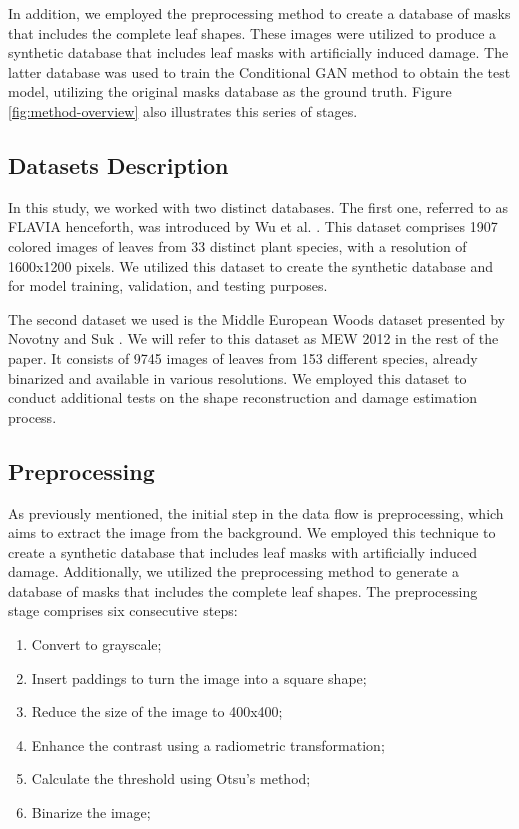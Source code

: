 In addition, we employed the preprocessing method to create a database of masks that includes the complete leaf shapes. These images were utilized to produce a synthetic database that includes leaf masks with artificially induced damage. The latter database was used to train the Conditional GAN method to obtain the test model, utilizing the original masks database as the ground truth. Figure \ref{fig:method-overview} also illustrates this series of stages.

\subsection{Datasets Description}

In this study, we worked with two distinct databases. The first one, referred to as FLAVIA henceforth, was introduced by Wu et al. \cite{wu2007leaf}. This dataset comprises 1907 colored images of leaves from 33 distinct plant species, with a resolution of 1600x1200 pixels. We utilized this dataset to create the synthetic database and for model training, validation, and testing purposes.

The second dataset we used is the Middle European Woods dataset presented by Novotny and Suk \cite{novotny2013leaf}. We will refer to this dataset as MEW 2012 in the rest of the paper. It consists of 9745 images of leaves from 153 different species, already binarized and available in various resolutions. We employed this dataset to conduct additional tests on the shape reconstruction and damage estimation process.

\subsection{Preprocessing}

As previously mentioned, the initial step in the data flow is preprocessing, which aims to extract the image from the background. We employed this technique to create a synthetic database that includes leaf masks with artificially induced damage. Additionally, we utilized the preprocessing method to generate a database of masks that includes the complete leaf shapes. The preprocessing stage comprises six consecutive steps:

\begin{enumerate}
    \item Convert to grayscale;
    \item Insert paddings to turn the image into a square shape;
    \item Reduce the size of the image to 400x400;
    \item Enhance the contrast using a radiometric transformation;
    \item Calculate the threshold using Otsu's method;
    \item Binarize the image;
\end{enumerate}

